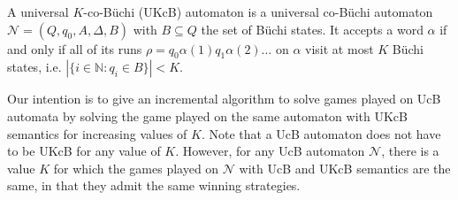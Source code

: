 \documentclass[runningheads,a4paper,draft]{llncs}
\newcommand{\calN}{\mathcal{N}}
\begin{document}
\begin{definition}
  A universal $K$-co-B\"uchi (UKcB) automaton is a universal co-Büchi automaton
  $\calN = (Q,q_0,A,\Delta,B)$ with $B \subseteq Q$ the set of B\"uchi
  states.  It accepts a word $\alpha$ if and only if all of its runs
  $\rho = q_0 \alpha(1) q_1 \alpha(2) \dots$ on $\alpha$ visit at most $K$
  B\"uchi states, i.e. $|\{i \in \mathbb{N} : q_i \in B\}| < K$.
\end{definition}

Our intention is to give an incremental algorithm to solve games played on UcB
automata by solving the game played on the same automaton with UKcB semantics
for increasing values of $K$.  Note that a UcB automaton does not have to be
UKcB for any value of \(K\).  However, for any UcB automaton \(\calN\), there is
a value \(K\) for which the games played on \(\calN\) with UcB and UKcB semantics
are the same, in that they admit the same winning strategies.
\end{document}
